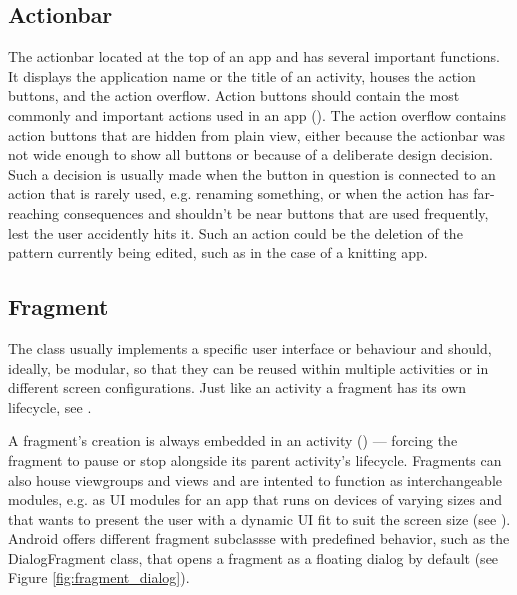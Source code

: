 \subsection{Actionbar}
The actionbar located at the top of an app and has several important functions. It displays the application name or the title of an activity, houses the action buttons, and the action overflow. Action buttons should contain the most commonly and important actions used in an app (\cite{actionbar}). The action overflow contains action buttons that are hidden from plain view, either because the actionbar was not wide enough to show all buttons or because of a deliberate design decision. Such a decision is usually made when the button in question is connected to an action that is rarely used, e.g. renaming something, or when the action has far-reaching consequences and shouldn't be near buttons that are used frequently, lest the user accidently hits it. Such an action could be the deletion of the pattern currently being edited, such as in the case of a knitting app. 

\subsection{Fragment}
The  class usually implements a specific user interface or behaviour and should, ideally, be modular, so that they can be reused within multiple activities or in different screen configurations. Just like an activity a fragment has its own lifecycle, see .

A fragment's creation is always embedded in an activity (\cite{androidfragment}) --- forcing the fragment to pause or stop alongside its parent activity's lifecycle. Fragments can also house viewgroups and views and are intented to function as interchangeable modules, e.g. as \gls{UI} modules for an app that runs on devices of varying sizes and that wants to present the user with a dynamic \gls{UI} fit to suit the screen size (see ). Android offers different fragment subclassse with predefined behavior, such as the DialogFragment class, that opens a fragment as a floating dialog by default (see Figure \ref{fig:fragment_dialog}).

